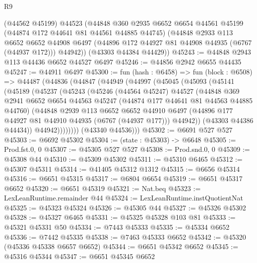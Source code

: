 \begin{lexlean}{R9}
\begin{coremodule}
      (@44562 @45199)
      @44523
      (@44848
        @360
        @2935
        @6652
        @6654
        @44561
        @45199
        (@44874 @172 @44641 @81 @44561 @44885 @44745)
        (@44848
          @2933
          @113
          @6652
          @6652
          @44908
          @6497
          (@44896 @172 @44927 @81 @44908 @44935 (@6767 (@44937 @172)))
          @44942))
      (@43303 @44384 @44429))
@45243 := @44848 @2943 @113 @44436 @6652 @44527 @6497
@45246 := @44856 @2942 @6655 @44435
@45247 := @44911 @6497
@45300 := fun (hash : @6458) =>
  fun (block : @6508) =>
  @44487
    (@44836
      (@44847
        (@44949
          (@44997
            (@45045
              (@45093
                (@45141
                  (@45189
                    (@45237
                      (@45243
                        (@45246
                          (@44564 @45247)
                          @44527
                          (@44848
                            @369
                            @2941
                            @6652
                            @6654
                            @44563
                            @45247
                            (@44874 @177 @44641 @81 @44563 @44885 @44760)
                            (@44848
                              @2939
                              @113
                              @6652
                              @6652
                              @44910
                              @6497
                              (@44896 @177 @44927 @81 @44910 @44935 (@6767 (@44937 @177)))
                              @44942))
                          (@43303 @44386 @44434))
                        @44942))))))))
        (@43340 @44536)))
@45302 := @6691 @527 @527
@45303 := @6692 @45302
@45304 := (state : @45303) -> @6648
@45305 := Prod.fst.{0, 0}
@45307 := @45305 @527 @527
@45308 := Prod.snd.{0, 0}
@45309 := @45308 @44
@45310 := @45309 @45302
@45311 := @45310 @6465
@45312 := @45307 @45311
@45314 := @41405 @45312 @1312
@45315 := @6656 @45314
@45316 := @6651 @45315
@45317 := @6804 @6654
@45319 := @6651 @45317 @6652
@45320 := @6651 @45319
@45321 := Nat.beq
@45323 := LexLeanRuntime.remainder @44
@45324 := LexLeanRuntime.instQuotientNat
@45325 := @45323 @45324
@45326 := @45305 @44
@45327 := @45326 @45302
@45328 := @45327 @6465
@45331 := @45325 @45328 @103 @81
@45333 := @45321 @45331 @50
@45334 := @7443 @45333
@45335 := @45334 @6652
@45336 := @7442 @45335
@45338 := @7463 @45333 @6652
@45342 := @45320 (@45336 @45338 @6657 @6652)
@45344 := @6651 @45342 @6652
@45345 := @45316 @45344
@45347 := @6651 @45345 @6652

\end{coremodule}
\end{lexlean}
